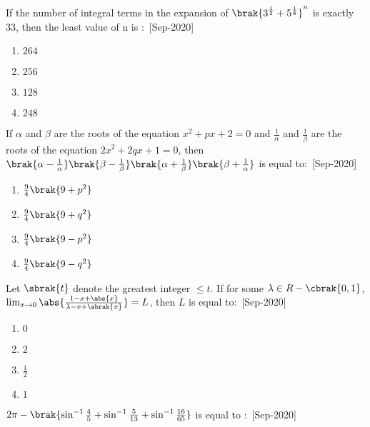 \iffalse
\title{2020}
\author{EE24BTECH11021}
\section{mcq-single}
\fi
  
  \item If the number of integral terms in the expansion of $\brak{3^{\frac{1}{2}}+5^{\frac{1}{8}}}^n$ is exactly $33$, then the least value of n is $\colon$
    \hfill{[Sep-2020]}
        \begin{enumerate}
            \item $264$
            \item $256$
            \item $128$
            \item $248$
        \end{enumerate}
    \item If $\alpha$ and $\beta$ are the roots of the equation $x^2+px+2=0$ and $\frac{1}{\alpha}$ and $\frac{1}{\beta}$ are the roots of the equation $2x^2+2qx+1=0$, then $\brak{\alpha-\frac{1}{\alpha}}\brak{\beta-\frac{1}{\beta}}\brak{\alpha + \frac{1}{\beta}}\brak{\beta +\frac{1}{\alpha}}$ is equal to$\colon$
    \hfill{[Sep-2020]}
        \begin{enumerate}
            \item $\frac{9}{4}\brak{9+p^2}$
            \item $\frac{9}{4}\brak{9+q^2}$
            \item $\frac{9}{4}\brak{9-p^2}$
            \item $\frac{9}{4}\brak{9-q^2}$
        \end{enumerate}
    \item Let $\sbrak{t}$ denote the greatest integer $\leq t$. If for some $\lambda\in R-\cbrak{0,1}$,\\
    $\lim_{x \to 0} \abs{\frac{1-x+\abs{x}}{\lambda-x+\sbrak{x}}}=L$, then $L$ is equal to$\colon$
   \hfill{[Sep-2020]}
        \begin{enumerate}
            \item $0$
            \item $2$
            \item $\frac{1}{2}$
            \item $1$
        \end{enumerate}
    \item $2\pi -\brak{\sin^{-1}{\frac{4}{5}}+\sin^{-1}{\frac{5}{13}}+\sin^{-1}{\frac{16}{65}}}$ is equal to $\colon$
    \hfill{[Sep-2020]}
